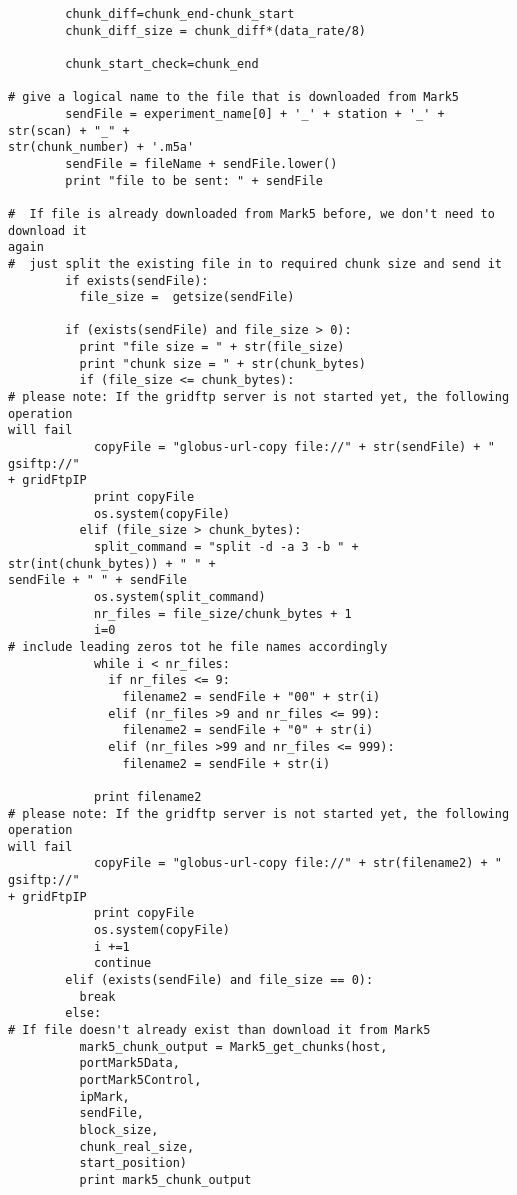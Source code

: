 \begin{verbatim}
        chunk_diff=chunk_end-chunk_start
        chunk_diff_size = chunk_diff*(data_rate/8)

        chunk_start_check=chunk_end

# give a logical name to the file that is downloaded from Mark5
        sendFile = experiment_name[0] + '_' + station + '_' + str(scan) + "_" +
str(chunk_number) + '.m5a'
        sendFile = fileName + sendFile.lower()
        print "file to be sent: " + sendFile

#  If file is already downloaded from Mark5 before, we don't need to download it
again
#  just split the existing file in to required chunk size and send it
        if exists(sendFile):
          file_size =  getsize(sendFile)

        if (exists(sendFile) and file_size > 0):
          print "file size = " + str(file_size)
          print "chunk size = " + str(chunk_bytes)
          if (file_size <= chunk_bytes):
# please note: If the gridftp server is not started yet, the following operation
will fail
            copyFile = "globus-url-copy file://" + str(sendFile) + " gsiftp://"
+ gridFtpIP
            print copyFile
            os.system(copyFile)
          elif (file_size > chunk_bytes):
            split_command = "split -d -a 3 -b " + str(int(chunk_bytes)) + " " +
sendFile + " " + sendFile
            os.system(split_command)
            nr_files = file_size/chunk_bytes + 1
            i=0
# include leading zeros tot he file names accordingly
            while i < nr_files:
              if nr_files <= 9:
                filename2 = sendFile + "00" + str(i)
              elif (nr_files >9 and nr_files <= 99):
                filename2 = sendFile + "0" + str(i)
              elif (nr_files >99 and nr_files <= 999):
                filename2 = sendFile + str(i)

            print filename2
# please note: If the gridftp server is not started yet, the following operation
will fail
            copyFile = "globus-url-copy file://" + str(filename2) + " gsiftp://"
+ gridFtpIP
            print copyFile
            os.system(copyFile)
            i +=1
            continue
        elif (exists(sendFile) and file_size == 0):
          break
        else:
# If file doesn't already exist than download it from Mark5
          mark5_chunk_output = Mark5_get_chunks(host, 
          portMark5Data,
          portMark5Control, 
          ipMark, 
          sendFile, 
          block_size, 
          chunk_real_size, 
          start_position)
          print mark5_chunk_output


\end{verbatim}
